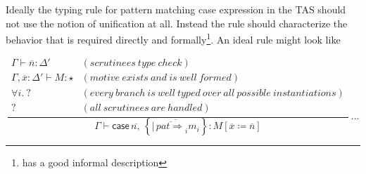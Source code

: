
Ideally the typing rule for pattern matching case expression in the
TAS should not use the notion of unification at all. Instead the rule
should characterize the behavior that is required directly and formally\footnote{\cite{coquand1992pattern} has a good informal description}.
An ideal rule might look like

\[
\frac{\begin{array}{cl}
\Gamma\vdash\overline{n}:\Delta' & (scrutinees\ type\ check)\\
\Gamma,\overline{x}:\Delta'\vdash M:\star & (motive\ exists\ and\ is\ well\ formed)\\
\forall i.\:? & (every\ branch\ is\ well\ typed\ over\ all\ possible\ instantiations)\\
? & (all\ scrutinees\ are\ handled)
\end{array}}{\Gamma\vdash\mathsf{case}\,\overline{n,}\,\left\{ \overline{|\,\overline{pat\Rightarrow}_{i}m_{i}}\right\} :M\left[\overline{x}\coloneqq\overline{n}\right]}\,...
\]

